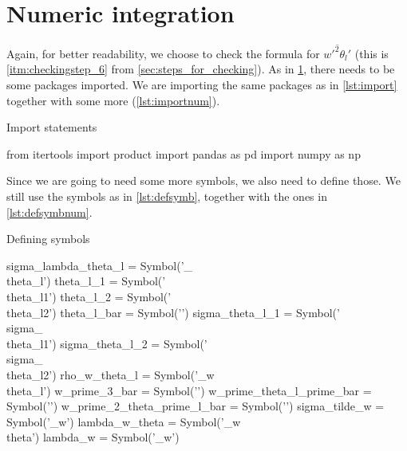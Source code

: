 \section{Numeric integration}\label{sec:numintsympy}

Again, for better readability, we choose to check the formula for $\overline{w'^2\theta_l'}$
(this is \cref{itm:checkingstep_6} from \cref{sec:steps_for_checking}).
As in \cref{sec:numintsympy}, there needs to be some packages imported.
We are importing the same packages as in \cref{lst:import} together with some more (\cref{lst:importnum}).
\begin{listing}[!ht]
    \caption{Import statements}
    \label{lst:importnum}
    \begin{pythoncode}
        from itertools import product
        import pandas as pd
        import numpy as np
    \end{pythoncode}
\end{listing}
Since we are going to need some more symbols, we also need to define those.
We still use the symbols as in \cref{lst:defsymb}, together with the ones in \cref{lst:defsymbnum}.
\begin{listing}[!ht]
    \caption{Defining symbols}
    \label{lst:defsymbnum}
    \begin{pythoncode}
        sigma_lambda_theta_l = Symbol('\sigma_{\lambda\\theta_l}')
        theta_l_1 = Symbol('\\theta_{l1}') 
        theta_l_2 = Symbol('\\theta_{l2}')
        theta_l_bar = Symbol('')
        sigma_theta_l_1 = Symbol('\\sigma_{\\theta_{l1}}')
        sigma_theta_l_2 = Symbol('\\sigma_{\\theta_{l2}}')
        rho_w_theta_l = Symbol('\rho_{w\\theta_l}')
        w_prime_3_bar = Symbol('')
        w_prime_theta_l_prime_bar = Symbol('')
        w_prime_2_theta_prime_l_bar = Symbol('')
        sigma_tilde_w = Symbol('\Tilde{\sigma}_w')
        lambda_w_theta = Symbol('\lambda_{w\\theta}')
        lambda_w = Symbol('\lambda_w')
    \end{pythoncode}
\end{listing}

